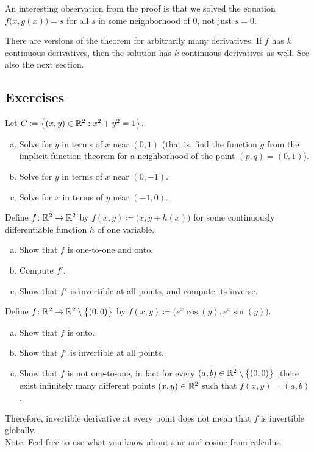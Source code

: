 An interesting observation from the proof is that we solved the equation
$f\bigl(x,g(x)\bigr) = s$ for all $s$ in some neighborhood of $0$, not just
$s=0$.

\begin{remark}
There are versions of the theorem for arbitrarily many derivatives.
If $f$ has $k$ continuous derivatives, then the solution has $k$
continuous derivatives as well.  See also the next section.
\end{remark}


\subsection{Exercises}

\begin{exercise}
Let $C \coloneqq \bigl\{ (x,y) \in {\mathbb{R}}^2 : x^2+y^2 = 1 \bigr\}$.
\begin{enumerate}[a)]
\item
Solve for $y$ in terms of $x$ near $(0,1)$ (that is, find the function $g$
from the implicit function theorem for a neighborhood of the point $(p,q) = (0,1)$).
\item
Solve for $y$ in terms of $x$ near $(0,-1)$.
\item
Solve for $x$ in terms of $y$ near $(-1,0)$.
\end{enumerate}
\end{exercise}

\begin{exercise}
Define $f \colon {\mathbb{R}}^2 \to {\mathbb{R}}^2$ by $f(x,y) \coloneqq
\bigl(x,y+h(x)\bigr)$ for some continuously differentiable function $h$ of one
variable.
\begin{enumerate}[a)]
\item
Show that $f$ is one-to-one and onto.
\item
Compute $f'$.
\item
Show that $f'$ is invertible at all points, and compute
its inverse.
\end{enumerate}
\end{exercise}

\begin{exercise}
Define $f \colon {\mathbb{R}}^2 \to {\mathbb{R}}^2 \setminus \bigl\{ (0,0) \bigr\}$ by
$f(x,y) \coloneqq \bigl(e^x\cos(y),e^x\sin(y)\bigr)$.
\begin{enumerate}[a)]
\item
Show that $f$ is onto.
\item
Show that $f'$ is invertible at all points.
\item
Show that $f$ is not one-to-one, in fact for every $(a,b) \in {\mathbb{R}}^2
\setminus \bigl\{ (0,0) \bigr\}$,
there exist infinitely many different points $(x,y) \in {\mathbb{R}}^2$ such that 
$f(x,y) = (a,b)$.
\end{enumerate}
Therefore, invertible derivative at every point does not mean that
$f$ is invertible globally.\\
Note: Feel free to use what you know about sine and cosine from calculus.
\end{exercise}

